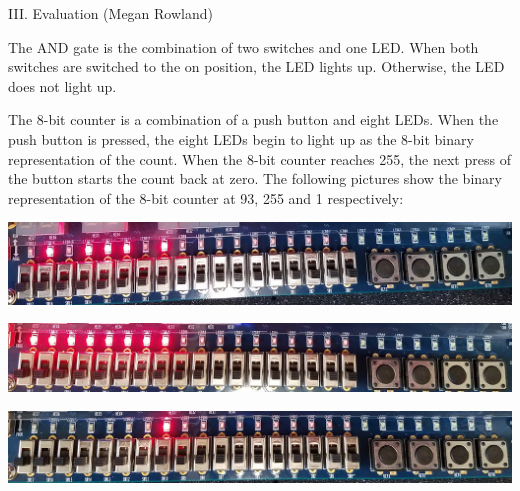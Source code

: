 \documentclass{article}
\newenvironment{Figure}
  {\par\medskip\noindent\ignorespaces\minipage{\linewidth}}
  {\endminipage\par\medskip}
\begin{document}
\begin{multicols*}{2}

\begin{center}
{\large III. Evaluation (Megan Rowland)}\\
\end{center}

The AND gate is the combination of two switches and one LED. When both switches are switched to the on position, the LED lights up. Otherwise, the LED does not light up.

The 8-bit counter is a combination of a push button and eight LEDs. When the push button is pressed, the eight LEDs begin to light up as the 8-bit binary representation of the count. When the 8-bit counter reaches 255, the next press of the button starts the count back at zero. The following pictures show the binary representation of the 8-bit counter at 93, 255 and 1 respectively:

\begin{Figure}
 \centering
 \includegraphics[width=\linewidth]{Binary93.jpg}
\end{Figure}

\begin{Figure}
 \centering
 \includegraphics[width=\linewidth]{Binary255.jpg}
\end{Figure}

\begin{Figure}
 \centering
 \includegraphics[width=\linewidth]{Binary1.jpg}
\end{Figure}



\end{multicols*}
\end{document}
